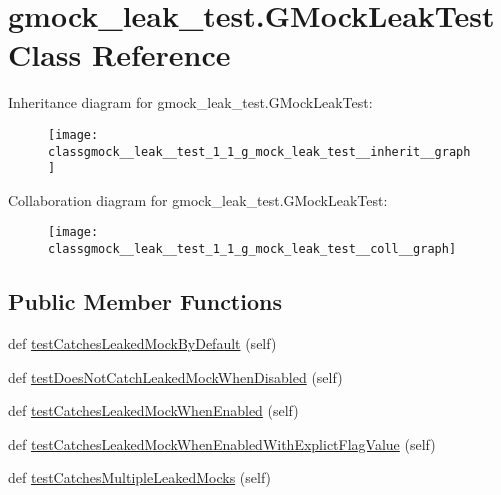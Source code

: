 \hypertarget{classgmock__leak__test_1_1_g_mock_leak_test}{}\section{gmock\+\_\+leak\+\_\+test.\+G\+Mock\+Leak\+Test Class Reference}
\label{classgmock__leak__test_1_1_g_mock_leak_test}


Inheritance diagram for gmock\+\_\+leak\+\_\+test.\+G\+Mock\+Leak\+Test\+:
\nopagebreak
\begin{figure}[H]
\begin{center}
\leavevmode
\texttt{[image: classgmock\_\_leak\_\_test\_1\_1\_g\_mock\_leak\_test\_\_inherit\_\_graph]}
\end{center}
\end{figure}


Collaboration diagram for gmock\+\_\+leak\+\_\+test.\+G\+Mock\+Leak\+Test\+:
\nopagebreak
\begin{figure}[H]
\begin{center}
\leavevmode
\texttt{[image: classgmock\_\_leak\_\_test\_1\_1\_g\_mock\_leak\_test\_\_coll\_\_graph]}
\end{center}
\end{figure}
\subsection*{Public Member Functions}
\begin{DoxyCompactItemize}
\item 
def \hyperlink{classgmock__leak__test_1_1_g_mock_leak_test_ad87d271de7b3f106e51272d6e9139c76}{test\+Catches\+Leaked\+Mock\+By\+Default} (self)
\item 
def \hyperlink{classgmock__leak__test_1_1_g_mock_leak_test_a3107bf5a603558ab2d97d88fb5589951}{test\+Does\+Not\+Catch\+Leaked\+Mock\+When\+Disabled} (self)
\item 
def \hyperlink{classgmock__leak__test_1_1_g_mock_leak_test_a78f4040a392d183597f71d92da8c1246}{test\+Catches\+Leaked\+Mock\+When\+Enabled} (self)
\item 
def \hyperlink{classgmock__leak__test_1_1_g_mock_leak_test_ab19cf302ea06e1b186bd6ab951d9161e}{test\+Catches\+Leaked\+Mock\+When\+Enabled\+With\+Explict\+Flag\+Value} (self)
\item 
def \hyperlink{classgmock__leak__test_1_1_g_mock_leak_test_a09465b2bfde98834e4bb9563c035f034}{test\+Catches\+Multiple\+Leaked\+Mocks} (self)
\end{DoxyCompactItemize}



